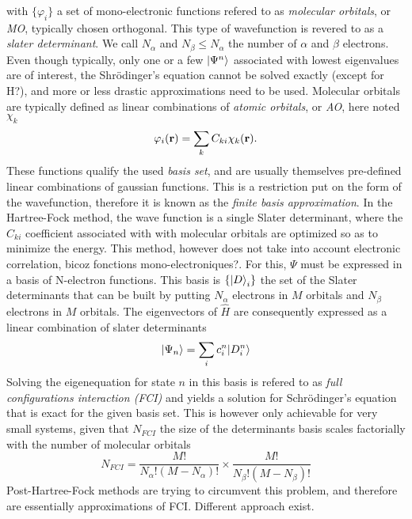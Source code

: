 \documentclass[./thesis.tex]{subfiles}
\begin{document}
with $\{ \varphi_i \}$ a set of mono-electronic functions refered to as \emph{molecular orbitals}, or \emph{MO}, typically chosen orthogonal. This type of wavefunction is revered to as a \emph{slater determinant}. We call $N_\alpha$ and $N_\beta \leq N_\alpha$ the number of $\alpha$ and $\beta$ electrons.
Even though typically, only one or a few $\ket{\Psi^n}$ associated with lowest eigenvalues are of interest, the Shrödinger's equation cannot be solved exactly \alert{(except for H?)}, and more or less drastic approximations need to be used. 
Molecular orbitals are typically defined as linear combinations of \emph{atomic orbitals}, or \emph{AO}, here noted $\chi_k$
\begin{equation}
 \varphi_i({\bf r}) = \sum_k C_{ki} \chi_k({\bf r}).
\end{equation}
These functions qualify the used \emph{basis set}, and are usually themselves pre-defined linear combinations of gaussian functions. This is a restriction put on the form of the wavefunction, therefore it is known as the \emph{finite basis approximation}.
In the Hartree-Fock method, the wave function is a single Slater determinant, where the $C_{ki}$ coefficient associated with with molecular orbitals are optimized so as to minimize the energy. This method, however does not take into account electronic correlation, \alert{bicoz fonctions mono-electroniques?}. For this, $\Psi$ must be expressed in a basis of N-electron functions. This basis is $\{\ket D_i \}$ the set of the Slater determinants that can be built by putting $N_\alpha$ electrons in $M$ orbitals and $N_\beta$ electrons in $M$ orbitals.
The eigenvectors of $\widehat{H}$ are consequently expressed as a linear combination of slater determinants 
\begin{equation}
\ket{\Psi_n} = \sum_{i} c_i^n |D_i^n \rangle 
\end{equation}
Solving the eigenequation for state $n$ in this basis is refered to as \emph{full configurations interaction (FCI)} and yields a solution for Schrödinger's equation that is exact for the given basis set.
This is however only achievable for very small systems, given that $N_{FCI}$ the size of the determinants basis scales \alert{factorially} with the number of molecular orbitals
\begin{equation}
N_{FCI} = \frac{M!}{N_\alpha ! (M-N_\alpha)!} \times \frac{M!}{N_\beta ! (M-N_\beta)!}
\end{equation}
Post-Hartree-Fock methods are trying to circumvent this problem, and therefore are essentially approximations of FCI. Different approach exist.
\end{document}
